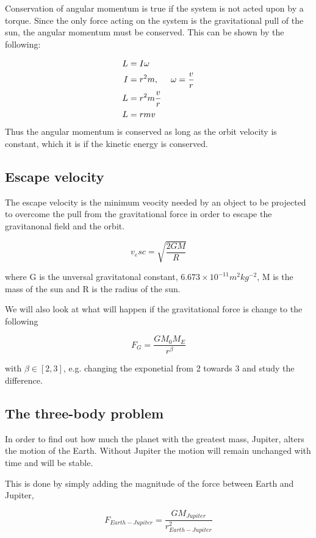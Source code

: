 \documentclass[../main.tex]{subfiles}
\begin{document}
Conservation of angular momentum is true if the system is not acted upon by a torque. Since the only force acting on the system is the gravitational pull of the sun, the angular momentum must be conserved. This can be shown by the following:

\begin{align*}
  L &= I \omega \\
  I &= r^2m, \hspace{5mm} \omega = \frac{v}{r} \\
  L &= r^2m \frac{v}{r} \\
  L &= rmv
\end{align*}
Thus the angular momentum is conserved as long as the orbit velocity is constant, which it is if the kinetic energy is conserved.

\subsection{Escape velocity}
The escape velocity is the minimum veocity needed by an object to be projected to overcome the pull from the gravitational force in order to escape the gravitanonal field and the orbit.

$$v_esc = \sqrt{\frac{2GM}{R}}$$

where G is the unversal gravitatonal constant, $6.673\times 10^{-11} m^2kg^{-2}$, M is the mass of the sun and R is the radius of the sun.

We will also look at what will happen if the gravitational force is change to the following

$$F_G = \frac{GM_0M_E}{r^{\beta}}$$

with $\beta \in [2,3]$, e.g. changing the exponetial from 2 towards 3 and study the difference.

\subsection{The three-body problem}
In order to find out how much the planet with the greatest mass, Jupiter, alters the motion of the Earth. Without Jupiter the motion will remain unchanged with time and  will be stable.

This is done by simply adding the magnitude of the force between Earth and Jupiter,

\begin{equation}
  F_{Earth-Jupiter} = \frac{GM_{Jupiter}}{r^2_{Earth-Jupiter}}
\end{equation}
\end{document}
